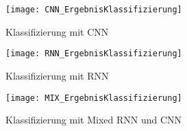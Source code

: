     \begin{figure}[H]
        \centering
        \texttt{[image: CNN\_ErgebnisKlassifizierung]}
        \caption{Klassifizierung mit CNN}
        \label{fig:CNN_RawClassification}
    \end{figure}

    \begin{figure}[H]
        \centering
        \texttt{[image: RNN\_ErgebnisKlassifizierung]}
        \caption{Klassifizierung mit RNN}
        \label{fig:RNN_RawClassification}
    \end{figure}

    \begin{figure}[H]
        \centering
        \texttt{[image: MIX\_ErgebnisKlassifizierung]}
        \caption{Klassifizierung mit Mixed RNN und CNN}
        \label{fig:MIX_RawClassification}
    \end{figure}
    
